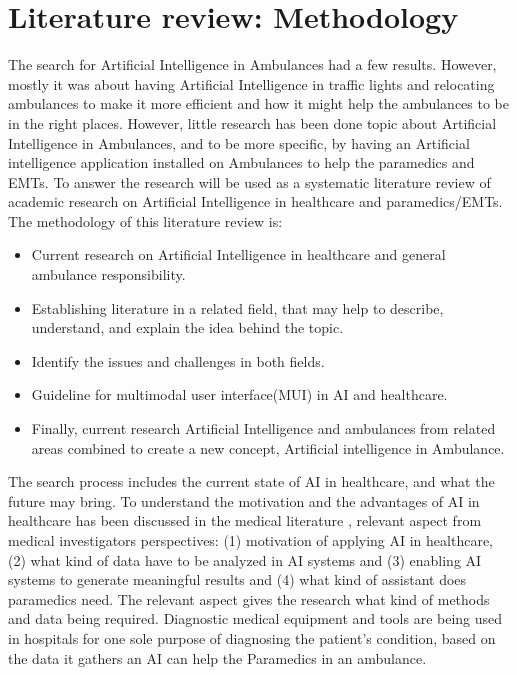 \documentclass[fleqn,10pt]{wlscirep}
\begin{document}
\section{Literature review: Methodology}
The search for Artificial Intelligence in Ambulances had a few results. However, mostly it was about having Artificial Intelligence in traffic lights and relocating ambulances to make it more efficient and how it might help the ambulances to be in the right places. However, little research has been done topic about Artificial Intelligence in Ambulances, and to be more specific, by having an Artificial intelligence application installed on Ambulances to help the paramedics and EMTs. To answer the research will be used as a systematic literature review of academic research on Artificial Intelligence in healthcare and paramedics/EMTs. The methodology of this literature review is: 
 \begin{itemize}
 \item Current research on Artificial Intelligence in healthcare and general ambulance responsibility.
 \item Establishing literature in a related field, that may help to describe, understand, and explain the idea behind the topic. 
 \item Identify the issues and challenges in both fields.
 \item Guideline for multimodal user interface(MUI) in AI and healthcare.
 \item Finally, current research Artificial Intelligence and ambulances from related areas combined to create a new concept, Artificial intelligence in Ambulance. 
\end{itemize}

The search process includes the current state of AI in healthcare, and what the future may bring. To understand the motivation and the advantages of AI in healthcare has been discussed in the medical literature \cite{Kilde5,Kilde6,Kilde7}, relevant aspect from medical investigators perspectives: (1) motivation of applying AI in healthcare, (2) what kind of data have to be analyzed in AI systems and (3) enabling AI systems to generate meaningful results and (4) what kind of assistant does paramedics need. The relevant aspect gives the research what kind of methods and data being required. Diagnostic medical equipment and tools are being used in hospitals for one sole purpose of diagnosing the patient's condition, based on the data it gathers an AI can help the Paramedics in an ambulance. 
\end{document}
